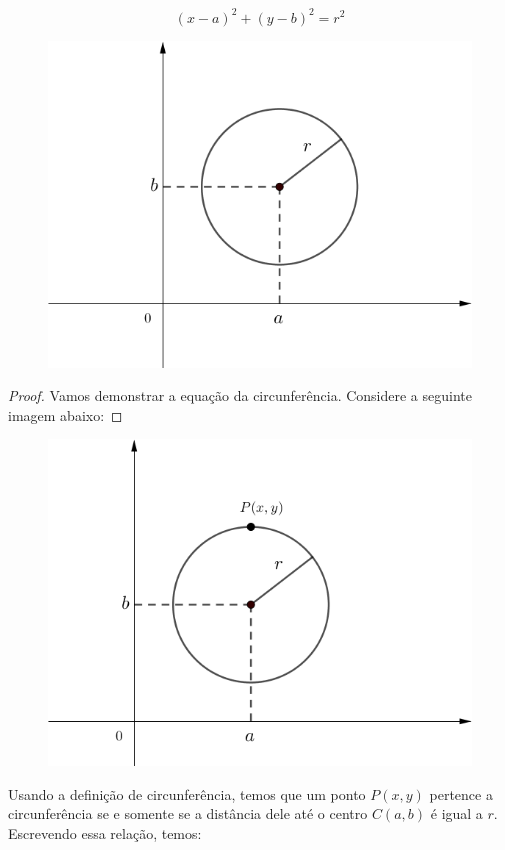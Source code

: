 $${(x - a)}^2 + {(y - b)}^2=r^2$$
\begin{figure}[H]
	\centering
	
	\includegraphics[scale=3.5]{imagens/circunferencia1.png}

\end{figure}
\newtheorem{proof}{Demonstração}
\begin{proof}
Vamos demonstrar a equação da circunferência.
Considere a seguinte imagem abaixo:
\end{proof}

\begin{figure}[H]
	\centering
	
	\includegraphics[scale=3.5]{imagens/circunferencia2.png}

\end{figure}
\begin{center}
Usando a definição de circunferência, temos que um ponto $P(x,y)$ pertence a circunferência se e somente se a distância dele até o centro $C(a,b)$ é igual a $r$. Escrevendo essa relação, temos:
\end{center}

